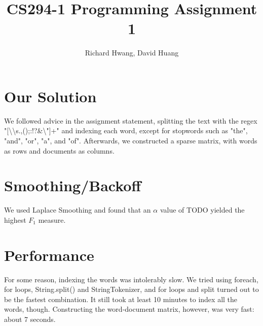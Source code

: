 \documentclass[11pt]{article}
\title{CS294-1 Programming Assignment 1}
\author{Richard Hwang, David Huang}
\begin{document}
\maketitle

\section{Our Solution}
We followed advice in the assignment statement, splitting the text with the regex "[\textbackslash \textbackslash s.,();:!?\&\textbackslash"]+" and indexing each word, except for stopwords such as "the", "and", "or", "a", and "of".  Afterwards, we constructed a sparse matrix, with words as rows and documents as columns.
\section{Smoothing/Backoff}
We used Laplace Smoothing and found that an $\alpha$ value of TODO yielded the highest $F_1$ measure.
\section{Performance}
For some reason, indexing the words was intolerably slow.  We tried using foreach, for loops, String.split() and StringTokenizer, and for loops and split turned out to be the fastest combination.  It still took at least 10 minutes to index all the words, though.  Constructing the word-document matrix, however, was very fast: about 7 seconds.
\end{document}
